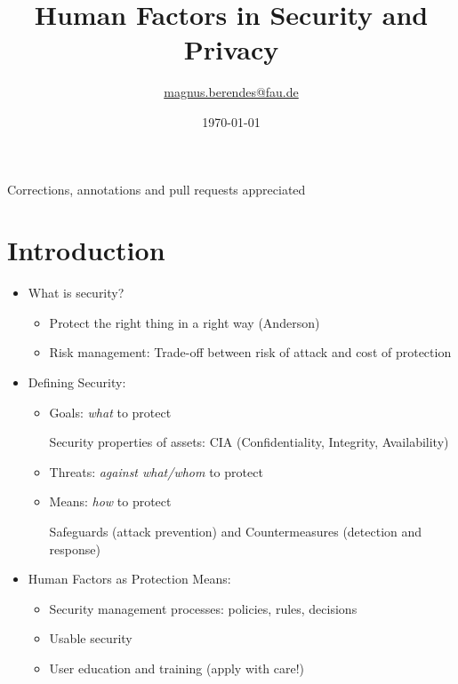 \documentclass[a4paper,12pt]{scrartcl}
\title{Human Factors in Security and Privacy}
\author{\href{mailto:magnus.berendes@fau.de}{magnus.berendes@fau.de}}
\date{\today}
\begin{document}
\maketitle

\vfill
\begin{centering}
	Corrections, annotations and pull requests appreciated
	\\
\end{centering}


\newpage

\tableofcontents
\newpage
\printindex
\printbibliography
\newpage

\section{Introduction}
\begin{itemize}
	\item
		What is security?
		\begin{itemize}
			\item
				Protect the right thing in a right way (Anderson)
			\item
				Risk management: Trade-off between risk of attack and cost of protection
		\end{itemize}
	\item
		Defining Security:
		\begin{itemize}
			\item
				Goals: \textit{what} to protect

				Security properties of assets: CIA (Confidentiality, Integrity, Availability)
			\item
				Threats: \textit{against what/whom} to protect
			\item
				Means: \textit{how} to protect

				Safeguards (attack prevention) and Countermeasures (detection and response)
		\end{itemize}
	\item
		Human Factors as Protection Means:
		\begin{itemize}
			\item
				Security management processes: policies, rules, decisions
			\item
				Usable security
			\item
				User education and training (apply with care!)
		\end{itemize}


\end{itemize}
\end{document}
